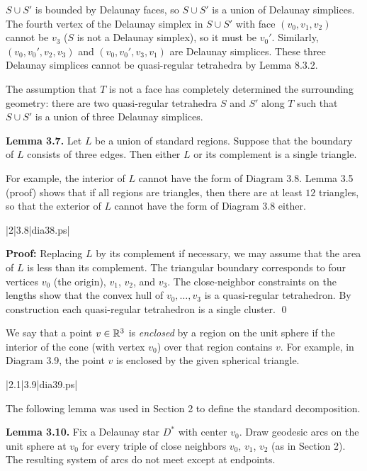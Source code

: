 $S\cup S'$ is bounded by Delaunay faces, so $S\cup S'$ is a union
of Delaunay simplices.  The fourth vertex of the
Delaunay simplex in $S\cup S'$ with face $(v_0,v_1,v_2)$ cannot
be $v_3$ ($S$ is not a Delaunay simplex), so
it must be $v_0'$.
Similarly, $(v_0,v_0',v_2,v_3)$ and $(v_0,v_0',v_3,v_1)$ are
Delaunay simplices.  These three Delaunay simplices cannot be
quasi-regular tetrahedra by Lemma 8.3.2. %

The assumption that $T$ is not a face has completely determined
the surrounding geometry:  there are two quasi-regular tetrahedra
$S$ and $S'$ along $T$ such that $S\cup S'$ is a union of three
Delaunay simplices.

\bigskip
{\bf Lemma 3.7.}  
Let $L$ be a union of standard
regions.  Suppose that the boundary of
$L$ consists of three edges.  Then either $L$ or its complement is a single 
triangle.

\smallskip

For example, the interior of $L$ cannot have the form
of Diagram 3.8.  Lemma 3.5 (proof) shows that if all regions are
triangles, then there are at least $12$ triangles, so that
the exterior of $L$ cannot have the form of Diagram 3.8 either.

\gram|2|3.8|dia38.ps|   %

{\bf Proof:} Replacing $L$ by its complement if necessary, we may assume
that the area of $L$ is less than its complement.  The triangular boundary
corresponds to four vertices $v_0$ (the origin), $v_1$, $v_2$, and $v_3$.
The close-neighbor constraints on the lengths 
show that
the convex hull of $v_0,\ldots,v_3$ is a quasi-regular tetrahedron.
By construction each quasi-regular tetrahedron is a single cluster.
\qed


We say that a point $v\in{\Bbb R}^3$ is {\it enclosed\/} by a region
on the unit sphere if the interior of the cone 
(with vertex $v_0$) over that region contains
$v$.  For example, in Diagram 3.9, the point $v$ is enclosed by
the given spherical triangle.  

\gram|2.1|3.9|dia39.ps|  %

\smallskip

The following lemma was used in Section 2 to define the standard
decomposition.

{\bf Lemma 3.10.}  Fix a Delaunay star $D^*$ with center $v_0$.
Draw geodesic arcs on the unit sphere at $v_0$ for every
triple of close neighbors $v_0$, $v_1$, $v_2$ (as in Section 2).
The resulting system of arcs do not meet except at endpoints.

